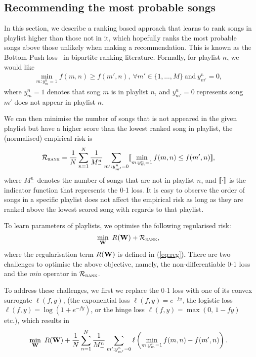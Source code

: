 \subsection{Recommending the most probable songs}
\label{ssec:bploss}

In this section, we describe a ranking based approach that learns to rank songs in playlist higher
than those not in it, which hopefully ranks the most probable songs above those unlikely when making a recommendation.
This is known as the Bottom-Push loss~\cite{rudin2009p} in bipartite ranking literature.
Formally, for playlist $n$, we would like
\begin{equation*}
\begin{aligned}
\min_{m: y_m^n = 1} f(m, n) \ge f(m', n), \ \forall m' \in \{1,\dots,M\} \ \text{and} \ y_{m'}^n = 0,
\end{aligned}
\end{equation*}
where $y_m^n = 1$ denotes that song $m$ is in playlist $n$,
and $y_{m'}^n = 0$ represents song $m'$ does not appear in playlist $n$.

We can then minimise the number of songs that is not appeared in the given playlist
but have a higher score than the lowest ranked song in playlist, \ie the (normalised) empirical risk is
\begin{equation}
\label{eq:bprisk}
\mathcal{R}_\textsc{rank} = \frac{1}{N} \sum_{n=1}^N \frac{1}{M_-^n} \sum_{m': y_{m'}^n = 0} \llbracket \min_{m: y_m^n = 1} f(m, n) \le f(m', n) \rrbracket,
\end{equation}
where $M_-^n$ denotes the number of songs that are not in playlist $n$,
and $\llbracket \cdot \rrbracket$ is the indicator function that represents the 0-1 loss.
It is easy to observe the order of songs in a specific playlist does not affect the empirical risk as long as they are ranked 
above the lowest scored song with regards to that playlist.

To learn parameters of playlists, we optimise the following regularised risk:
$$
\min_{\mathbf{W}} \ R(\mathbf{W}) + \mathcal{R}_\textsc{rank},
$$
where the regularisation term $R(\mathbf{W})$ is defined in (\ref{eq:reg}).
There are two challenges to optimise the above objective,
namely, the non-differentiable 0-1 loss and the \emph{min} operator in $\mathcal{R}_\textsc{rank}$.

To address these challenges, we first we replace the 0-1 loss with one of its convex surrogate $\ell(f, y)$,
(\eg the exponential loss $\ell(f, y) = e^{-fy}$, the logistic loss $\ell(f, y) = \log(1 + e^{-fy})$,
or the hinge loss $\ell(f, y) = \max(0, \, 1 - fy)$ etc.),
which results in
\begin{equation}
\label{eq:obj}
\min_{\mathbf{W}} \ R(\mathbf{W}) + \frac{1}{N} \sum_{n=1}^N \frac{1}{M_-^n} \sum_{m': y_{m'}^n = 0} \ell \left( \min_{m: y_m^n = 1} f(m, n) - f(m', n) \right).
\end{equation}

